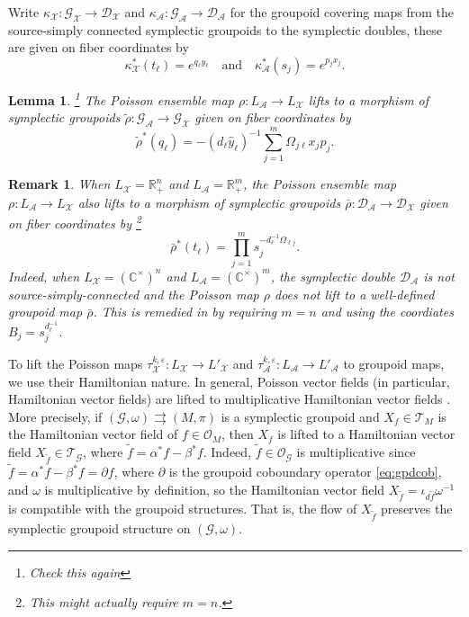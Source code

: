 \documentclass{amsart}
\newtheorem{lemma}[theorem]{Lemma}
\newtheorem{remark}[theorem]{Remark}
\numberwithin{equation}{section}
\newcommand{\cA}{\mathcal{A}}
\newcommand{\cG}{\mathcal{G}}
\renewcommand{\cD}{\mathcal{D}}
\newcommand{\cO}{\mathcal{O}}
\newcommand{\cX}{\mathcal{X}}
\newcommand{\cT}{\mathcal{T}}
\newcommand{\CC}{\mathbb{C}}
\newcommand{\RR}{\mathbb{R}}
\newcommand{\rra}{\rightrightarrows}
\begin{document}
Write $\kappa_\cX:\cG_\cX\to\cD_\cX$ and $\kappa_\cA:\cG_\cA\to\cD_\cA$ for the groupoid covering maps from the source-simply connected symplectic groupoids to the symplectic doubles, these are given on fiber coordinates by
\[\kappa_\cX^*(t_\ell)=e^{q_\ell y_\ell}\quad\text{and}\quad\kappa_\cA^*(s_j)=e^{p_j x_j}.\]
\begin{lemma}
  \footnote{Check this again}
  The Poisson ensemble map $\rho:L_\cA\to L_\cX$ lifts to a morphism of symplectic groupoids $\tilde\rho:\cG_\cA\to\cG_\cX$ given on fiber coordinates by 
  \[\tilde\rho^*(q_\ell)=-(d_\ell\hat y_\ell)^{-1}\sum\limits_{j=1}^m\Omega_{j\ell}x_jp_j.\]
\end{lemma}
\begin{remark}
  When $L_\cX=\RR_+^n$ and $L_\cA=\RR_+^m$, the Poisson ensemble map $\rho:L_\cA\to L_\cX$ also lifts to a morphism of symplectic groupoids $\bar\rho:\cD_\cA\to\cD_\cX$ given on fiber coordinates by 
  \footnote{This might actually require $m=n$.}
  \[\bar\rho^*(t_\ell)=\prod\limits_{j=1}^m s_j^{-d_\ell^{-1}\Omega_{\ell j}}.\]
Indeed, when $L_\cX=(\CC^\times)^n$ and $L_\cA=(\CC^\times)^m$, the symplectic double $\cD_\cA$ is not source-simply-connected and the Poisson map $\rho$ does not lift to a well-defined groupoid map $\bar\rho$. This is remedied in \cite{MR2470108} by requiring $m=n$ and using the coordiates $B_j = s_j^{d_\ell^{-1}}$.
\end{remark}

To lift the Poisson maps $\tau_\cX^{k,\varepsilon}:L_\cX\to L'_\cX$ and $\tau_\cA^{k,\varepsilon}:L_\cA\to L'_\cA$ to groupoid maps, we use their Hamiltonian nature.
In general, Poisson vector fields (in particular, Hamiltonian vector fields) are lifted to multiplicative Hamiltonian vector fields \cite{MR2504211}.
More precisely, if $(\cG, \omega) \rra (M, \pi)$ is a symplectic groupoid and $X_f \in \cT_M$ is the Hamiltonian vector field of $f \in \cO_M$, then $X_f$ is lifted to a Hamiltonian vector field $X_{\tilde{f}} \in \cT_\cG$, where $\tilde{f} = \alpha^*f - \beta^*f$.
Indeed, $\tilde{f} \in \cO_\cG$ is multiplicative since $\tilde{f} = \alpha^*f - \beta^*f = \partial f$, where $\partial$ is the groupoid coboundary operator \eqref{eq:gpdcob}, and $\omega$ is multiplicative by definition, so the Hamiltonian vector field $X_{\tilde{f}} = \iota_{d\tilde{f}}\omega^{-1}$ is compatible with the groupoid structures.
That is, the flow of $X_{\tilde{f}}$ preserves the symplectic groupoid structure on $(\cG,\omega)$.
\end{document}
